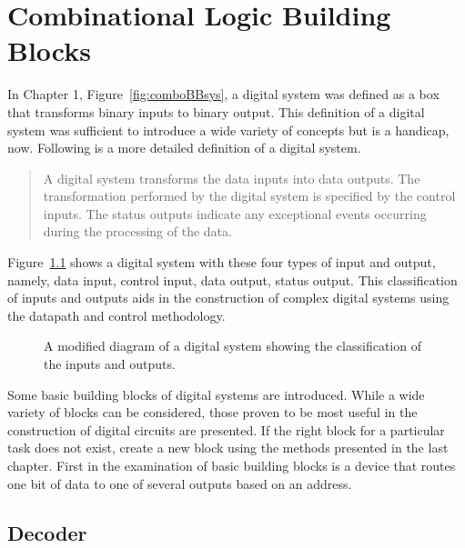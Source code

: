 \chapter{Combinational Logic Building Blocks}
\label{chapter:Combinational Building Blocks}
\graphicspath{ {./chapter04/Fig} }

In Chapter 1, Figure~\ref{fig:comboBBsys}, a digital system was defined 
as a box that transforms binary inputs to binary output.  This definition 
of a digital system was sufficient to introduce  a wide variety of 
concepts but is a handicap, now. Following is a more detailed 
definition of a digital system.
\begin{quote}  A digital system transforms the data inputs into 
data outputs.  The transformation performed by the digital system is 
specified by the control inputs.  The status outputs indicate any
exceptional events occurring during the processing of the data.
\end{quote}

Figure~\ref{fig:comboBBAsys} shows a digital system with these four types
of input and output, namely, data input, control input, data output, status output.
This classification of inputs and outputs aids in the
construction of complex digital systems using the datapath and
control methodology.

\begin{figure}[ht]
\caption{A modified diagram of a digital system showing the classification
of the inputs and outputs.}
\label{fig:comboBBAsys}
\end{figure}

Some basic building blocks of digital systems are introduced.  
While a wide variety of blocks can be considered, those
proven to be most useful in the construction 
of digital circuits are presented.  If the right block for a particular
task does not exist, create a new block using the methods presented 
in the last chapter.  First in the examination of basic building 
blocks is a device that routes one bit of data to one of several
outputs based on an address.

\section{Decoder}

